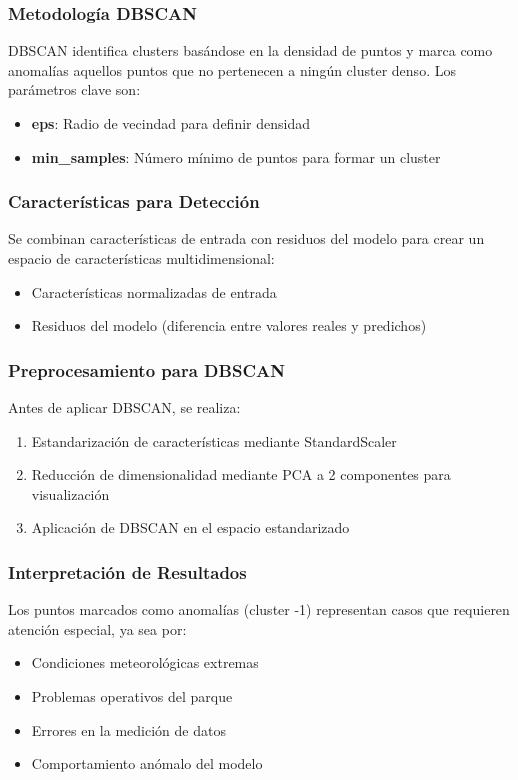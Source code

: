 \documentclass[conference]{IEEEtran}
\begin{document}
	\subsubsection{Metodología DBSCAN}
	DBSCAN identifica clusters basándose en la densidad de puntos y marca como anomalías aquellos puntos que no pertenecen a ningún cluster denso. Los parámetros clave son:
	\begin{itemize}
		\item \textbf{eps}: Radio de vecindad para definir densidad
		\item \textbf{min\_samples}: Número mínimo de puntos para formar un cluster
	\end{itemize}
	
	\subsubsection{Características para Detección}
	Se combinan características de entrada con residuos del modelo para crear un espacio de características multidimensional:
	\begin{itemize}
		\item Características normalizadas de entrada
		\item Residuos del modelo (diferencia entre valores reales y predichos)
	\end{itemize}
	
	\subsubsection{Preprocesamiento para DBSCAN}
	Antes de aplicar DBSCAN, se realiza:
	\begin{enumerate}
		\item Estandarización de características mediante StandardScaler
		\item Reducción de dimensionalidad mediante PCA a 2 componentes para visualización
		\item Aplicación de DBSCAN en el espacio estandarizado
	\end{enumerate}
	
	\subsubsection{Interpretación de Resultados}
	Los puntos marcados como anomalías (cluster -1) representan casos que requieren atención especial, ya sea por:
	\begin{itemize}
		\item Condiciones meteorológicas extremas
		\item Problemas operativos del parque
		\item Errores en la medición de datos
		\item Comportamiento anómalo del modelo
	\end{itemize}
	
\end{document}
